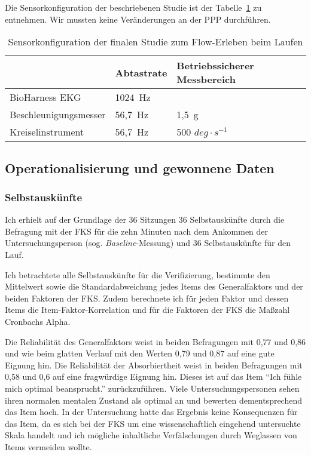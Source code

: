 Die Sensorkonfiguration der beschriebenen Studie ist der Tabelle~\ref{tab:sensorkonfiguration_studie_laufen} zu entnehmen. Wir mussten keine Veränderungen an der \ac{PPP} durchführen. 

\begin{table}[t]
	\caption[Sensorkonfiguration der finalen Studie zum Flow-Erleben beim Laufen]{Sensorkonfiguration der finalen Studie zum Flow-Erleben beim Laufen}
	\label{tab:sensorkonfiguration_studie_laufen}
	\begin{tabularx}{\textwidth}{p{} p{} p{}}
\toprule
& Abtastrate & Betriebssicherer Messbereich \\
\midrule
BioHarness EKG & 1024~Hz & \\
Beschleunigungsmesser & 56,7~Hz & 1,5~g \\
Kreiselinstrument & 56,7~Hz & 500 $deg \cdot s^{-1}$ \\
\bottomrule
\end{tabularx}
\end{table}

\subsection{Operationalisierung und gewonnene Daten}

\subsubsection{Selbstauskünfte}
Ich erhielt auf der Grundlage der 36 Sitzungen 36 Selbstauskünfte durch die Befragung mit der \ac{FKS} für die zehn Minuten nach dem Ankommen der Untersuchungsperson (sog. \emph{Baseline}-Messung) und 36 Selbstauskünfte für den Lauf. 

Ich betrachtete alle Selbstauskünfte für die Verifizierung, bestimmte den Mittelwert sowie die Standardabweichung jedes Items des Generalfaktors und der beiden Faktoren der \ac{FKS}. Zudem berechnete ich für jeden Faktor und dessen Items die Item-Faktor-Korrelation und für die Faktoren der \ac{FKS} die Maßzahl Cronbachs Alpha. 

Die Reliabilität des Generalfaktors weist in beiden Befragungen mit 0,77 und 0,86 und wie beim glatten Verlauf mit den Werten 0,79 und 0,87 auf eine gute Eignung hin. Die Reliabilität der Absorbiertheit weist in beiden Befragungen mit 0,58 und 0,6 auf eine fragwürdige Eignung hin. Dieses ist auf das Item "`Ich fühle mich optimal beansprucht."' zurückzuführen. Viele Untersuchungspersonen sehen ihren normalen mentalen Zustand als optimal an und bewerten dementsprechend das Item hoch. In der Untersuchung hatte das Ergebnis keine Konsequenzen für das Item, da es sich bei der \ac{FKS} um eine wissenschaftlich eingehend untersuchte Skala handelt und ich mögliche inhaltliche Verfälschungen durch Weglassen von Items vermeiden wollte. 


